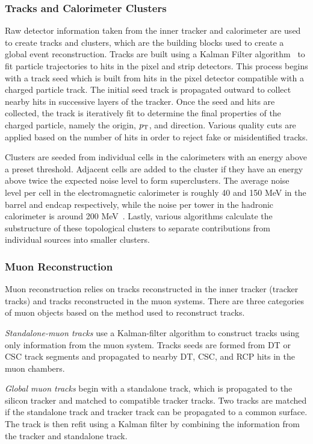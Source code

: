 \subsubsection{Tracks and Calorimeter Clusters} \label{sec:CMS_trk_clusters}
Raw detector information taken from the inner tracker and calorimeter are used to create tracks and clusters, which are the building blocks used to create a global event reconstruction. Tracks are built using a Kalman Filter algorithm~\cite{cms_tracking} to fit particle trajectories to hits in the pixel and strip detectors. This process begins with a track seed which is built from hits in the pixel detector compatible with a charged particle track. The initial seed track is propagated outward to collect nearby hits in successive layers of the tracker. Once the seed and hits are collected, the track is iteratively fit to determine the final properties of the charged particle, namely the origin, $p_{\mathrm{T}}$, and direction. Various quality cuts are applied based on the number of hits in order to reject fake or misidentified tracks.

Clusters are seeded from individual cells in the calorimeters with an energy above a preset threshold. Adjacent cells are added to the cluster if they have an energy above twice the expected noise level to form superclusters. The average noise level per cell in the electromagnetic calorimeter is roughly 40 and 150 MeV in the barrel and endcap respectively, while the noise per tower in the hadronic calorimeter is around 200 MeV~\cite{Sirunyan:PF}. Lastly, various algorithms calculate the substructure of these topological clusters to separate contributions from individual sources into smaller clusters.

\subsubsection{Muon Reconstruction} \label{sec:CMS_Reco_mu}
Muon reconstruction relies on tracks reconstructed in the inner tracker (tracker tracks) and tracks reconstructed in the muon systems. There are three categories of muon objects based on the method used to reconstruct tracks.

\textit{Standalone-muon tracks} use a Kalman-filter algorithm to construct tracks using only information from the muon system. Tracks seeds are formed from DT or CSC track segments and propagated to nearby DT, CSC, and RCP hits in the muon chambers.

\textit{Global muon tracks} begin with a standalone track, which is propagated to the silicon tracker and matched to compatible tracker tracks. Two tracks are matched if the standalone track and tracker track can be propagated to a common surface. The track is then refit using a Kalman filter by combining the information from the tracker and standalone track. 

